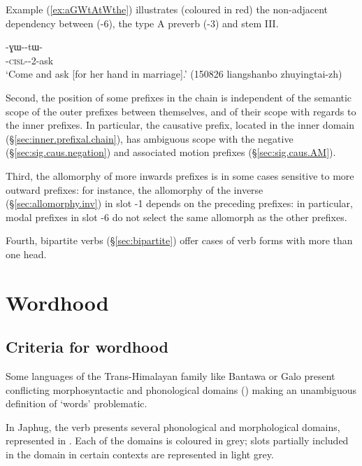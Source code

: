  Example (\ref{ex:aGWtAtWthe}) illustrates (coloured in red) the non-adjacent dependency between  (-6), the type A preverb (-3) and stem III.
 
 \begin{exe}
\ex \label{ex:aGWtAtWthe}
\gll {}-ɣɯ--tɯ- \\
 -\textsc{cisl}--2-ask\rouge{[III]} \\
\glt `Come and ask [for her hand in marriage].' (150826 liangshanbo zhuyingtai-zh) 
\end{exe}
 
  
Second, the position of some prefixes in the chain is independent of the semantic scope of the outer prefixes between themselves, and of their scope with regards to the inner prefixes.  In particular, the causative prefix, located in the inner domain (§\ref{sec:inner.prefixal.chain}), has ambiguous scope with the negative (§\ref{sec:sig.caus.negation}) and associated motion prefixes (§\ref{sec:sig.caus.AM}).  

Third, the allomorphy of more inwards prefixes is in some cases sensitive to more outward prefixes: for instance, the allomorphy of the inverse (§\ref{sec:allomorphy.inv}) in slot -1 depends on the preceding prefixes: in particular, modal prefixes in slot -6 do not select the same allomorph as the other prefixes. 

Fourth, bipartite verbs (§\ref{sec:bipartite}) offer cases of verb forms with more than one head.


 \section{Wordhood} \label{sec:wordhood.verb}

\subsection{Criteria for wordhood} \label{sec:wordhood.criteria.verb}
Some languages of the Trans-Himalayan family  like Bantawa or Galo present conflicting morphosyntactic and phonological domains (\citealt{post09disunity, schiering10prosodic, doornenbal09}) making an unambiguous definition of `words' problematic.
 
In Japhug, the verb presents several phonological and morphological domains, represented in . Each of the domains is coloured in grey; slots partially included in the domain in certain contexts are represented in light grey.
 
